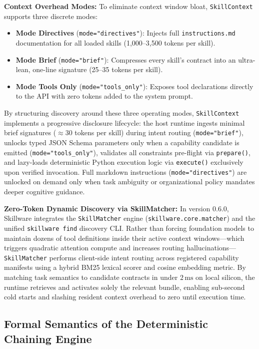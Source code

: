 \textbf{Context Overhead Modes:} To eliminate context window bloat, \texttt{SkillContext} supports three discrete modes:
\begin{itemize}[leftmargin=*]
  \item \textbf{Mode Directives} (\texttt{mode="directives"}): Injects full \texttt{instructions.md} documentation for all loaded skills (1,000--3,500 tokens per skill).
  \item \textbf{Mode Brief} (\texttt{mode="brief"}): Compresses every skill's contract into an ultra-lean, one-line signature (25--35 tokens per skill).
  \item \textbf{Mode Tools Only} (\texttt{mode="tools\_only"}): Exposes tool declarations directly to the API with zero tokens added to the system prompt.
\end{itemize}
By structuring discovery around these three operating modes, \texttt{SkillContext} implements a progressive disclosure lifecycle: the host runtime ingests minimal brief signatures ($\approx 30$ tokens per skill) during intent routing (\texttt{mode="brief"}), unlocks typed JSON Schema parameters only when a capability candidate is emitted (\texttt{mode="tools\_only"}), validates all constraints pre-flight via \texttt{prepare()}, and lazy-loads deterministic Python execution logic via \texttt{execute()} exclusively upon verified invocation. Full markdown instructions (\texttt{mode="directives"}) are unlocked on demand only when task ambiguity or organizational policy mandates deeper cognitive guidance.

\textbf{Zero-Token Dynamic Discovery via SkillMatcher:} In version 0.6.0, Skillware integrates the \texttt{SkillMatcher} engine (\texttt{skillware.core.matcher}) and the unified \texttt{skillware find} discovery CLI. Rather than forcing foundation models to maintain dozens of tool definitions inside their active context windows—which triggers quadratic attention compute and increases routing hallucinations—\texttt{SkillMatcher} performs client-side intent routing across registered capability manifests using a hybrid BM25 lexical scorer and cosine embedding metric. By matching task semantics to candidate contracts in under $2\,\text{ms}$ on local silicon, the runtime retrieves and activates solely the relevant bundle, enabling sub-second cold starts and slashing resident context overhead to zero until execution time.

\subsection{Formal Semantics of the Deterministic Chaining Engine}
\label{subsec:chaining_engine}

